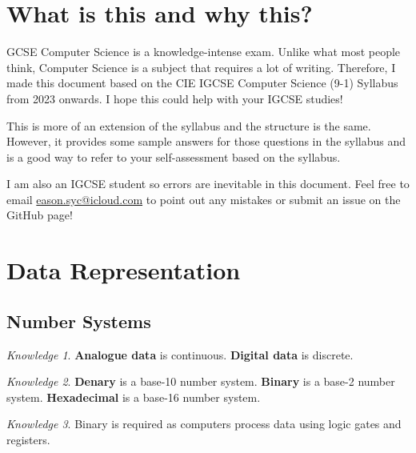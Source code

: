 \documentclass[8pt]{article}
\author{\Author}
\title{\Title}
\date{Version 1.0.1. \Date}
\theoremstyle{remark}
\newtheorem{knowledge}{Knowledge}[subsection]
\begin{document}
	\maketitle

	\tableofcontents

    \section*{What is this and why this?}
    
        GCSE Computer Science is a knowledge-intense exam. Unlike what most people think, Computer Science is a subject that requires a lot of writing. Therefore, I made this document based on the CIE IGCSE Computer Science (9-1) Syllabus from 2023 onwards. I hope this could help with your IGCSE studies!

        This is more of an extension of the syllabus and the structure is the same. However, it provides some sample answers for those questions in the syllabus and is a good way to refer to your self-assessment based on the syllabus.

        I am also an IGCSE student so errors are inevitable in this document. Feel free to email \href{eason.syc@icloud.com}{eason.syc@icloud.com} to point out any mistakes or submit an issue on the GitHub page!
        
    \section{Data Representation}
        \subsection{Number Systems}

        \begin{knowledge}
            \textbf{Analogue data} is continuous. \textbf{Digital data} is discrete.
        \end{knowledge}

        \begin{knowledge}
            \textbf{Denary} is a base-10 number system. \textbf{Binary} is a base-2 number system. \textbf{Hexadecimal} is a base-16 number system.
        \end{knowledge}

        \begin{knowledge}
            Binary is required as computers process data using logic gates and registers.
        \end{knowledge}
\end{document}

